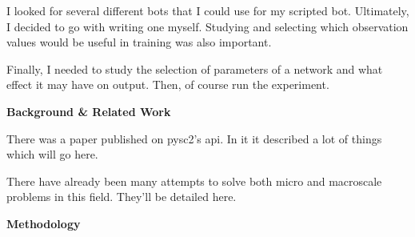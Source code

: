 \documentclass{amsart}
\newcounter{temp}
\theoremstyle{definition}
\begin{document}
I looked for several different bots that I could use for my scripted bot.
Ultimately, I decided to go with writing one myself.
Studying and selecting which observation values would be useful in training was also important.

Finally, I needed to study the selection of parameters of a network and what effect it may have on output.
Then, of course run the experiment.








\textbf{Background \& Related Work}


There was a paper published on pysc2's api.
In it it described a lot of things which will go here.

There have already been many attempts to solve both micro and macroscale problems in this field.
They'll be detailed here.












\textbf{Methodology}

\end{document}
